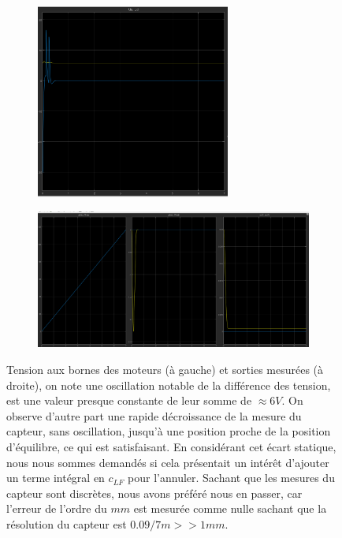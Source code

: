 \documentclass{report}
\begin{document}
\begin{figure}[h]  %
    \centering
    \begin{subfigure}{\textwidth}
        \centering
        \includegraphics[width=0.7\textwidth]{figures/sysSimulBFrepInputs.png}        
      \end{subfigure}   
    \newline
      \begin{subfigure}{\textwidth}
        \centering
        \includegraphics[width=\textwidth]{figures/sysSimulBFrepOutputs.png}
      \end{subfigure}    
      \caption{
    Tension aux bornes des moteurs (à gauche) 
    et sorties mesurées (à droite), on note une oscillation notable
    de la différence des tension, est une valeur presque constante 
    de leur somme de $\approx 6V$. 
    On observe d'autre part une rapide décroissance de la 
    mesure du capteur, sans oscillation, jusqu'à une position proche de la position
    d'équilibre, ce qui est satisfaisant.
    En considérant cet écart statique, nous nous sommes demandés si cela présentait un
    intérêt d'ajouter un terme intégral en $c_{LF}$ pour l'annuler.
    Sachant que les mesures du capteur sont discrètes, nous avons préféré nous en passer,
    car l'erreur de l'ordre du $mm$ est mesurée comme nulle sachant que la résolution
    du capteur est $0.09 / 7 m >> 1 mm $. }
\end{figure}
\end{document}
